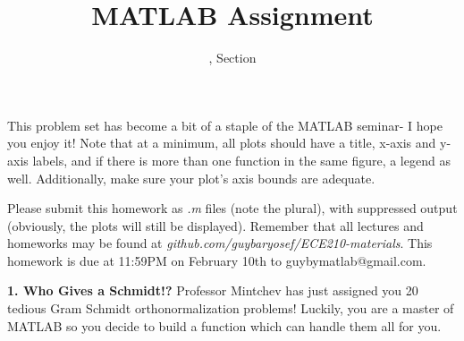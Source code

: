 \documentclass[11pt]{article}
\title{MATLAB Assignment \Homework}
\author{\Session, Section \Section}
\date{}
\makeatletter
\def\MyEmail{guybymatlab@gmail.com}
\def\DateOfSubmission{February 10th }
\makeatother
\begin{document}
\maketitle
This problem set has become a bit of a staple of the MATLAB seminar- I hope you enjoy it!
Note that at a minimum, all plots should have a title, x-axis and y-axis labels,
and if there is more than one function in the same figure, a legend as well.
Additionally, make sure your plot's axis bounds are adequate. 

Please submit this homework as \textit{.m} files (note the plural), 
with suppressed output (obviously, the plots will still be displayed).
Remember that all lectures and homeworks may be found at 
\textit{github.com/guybaryosef/ECE210-materials}.
This homework is due at 11:59PM on \DateOfSubmission to \MyEmail. 

\noindent
\newline
\textbf{1. Who Gives a Schmidt!?}
Professor Mintchev has just assigned you 20 tedious Gram Schmidt orthonormalization problems!
Luckily, you are a master of MATLAB so you decide to build a function which can handle them all
for you.
\end{document}
